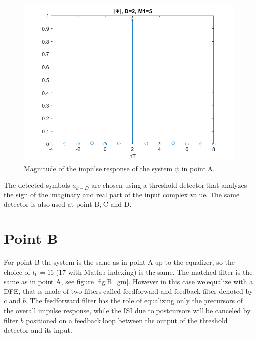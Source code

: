 \documentclass[a4paper,11.5pt]{article}
\begin{document}
\begin{figure}[H]
	\begin{center}   
		\includegraphics[width=\textwidth]{figs/A_psi.png} 
		\caption{Magnitude of the impulse response of the system $\psi$ in point A.}
		\label{fig:A_psi}
	\end{center}
\end{figure}

The detected symbols $a_{k-D}$ are chosen using a threshold detector that analyzes the sign of the imaginary and real part of the input complex value. The same detector is also used at point B, C and D.


\section*{Point B}

For point B the system is the same as in point A up to the equalizer, so the choice of $\bar{t}_0=16$ (17 with Matlab indexing) is the same. The matched filter is the same as in point A, see figure \ref{fig:B_gm}. However in this case we equalize with a DFE, that is made of two filters called feedforward and feedback filter denoted by $c$ and $b$. The feedforward filter has the role of equalizing only the precursors of the overall impulse response, while the ISI due to postcursors will be canceled by filter $b$ positioned on a feedback loop between the output of the threshold detector and its input. 
\end{document}
